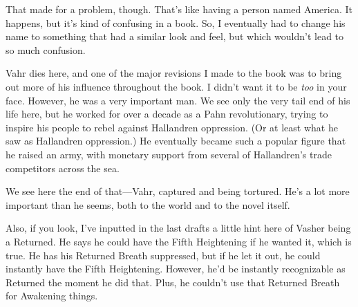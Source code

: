 That made for a problem, though. That’s like having a person named America. It happens, but it’s kind of confusing in a book. So, I eventually had to change his name to something that had a similar look and feel, but which wouldn’t lead to so much confusion.

Vahr dies here, and one of the major revisions I made to the book was to bring out more of his influence throughout the book. I didn’t want it to be \textit{too} in your face. However, he was a very important man. We see only the very tail end of his life here, but he worked for over a decade as a Pahn revolutionary, trying to inspire his people to rebel against Hallandren oppression. (Or at least what he saw as Hallandren oppression.) He eventually became such a popular figure that he raised an army, with monetary support from several of Hallandren’s trade competitors across the sea.

We see here the end of that—Vahr, captured and being tortured. He’s a lot more important than he seems, both to the world and to the novel itself.

Also, if you look, I’ve inputted in the last drafts a little hint here of Vasher being a Returned. He says he could have the Fifth Heightening if he wanted it, which is true. He has his Returned Breath suppressed, but if he let it out, he could instantly have the Fifth Heightening. However, he’d be instantly recognizable as Returned the moment he did that. Plus, he couldn’t use that Returned Breath for Awakening things.



